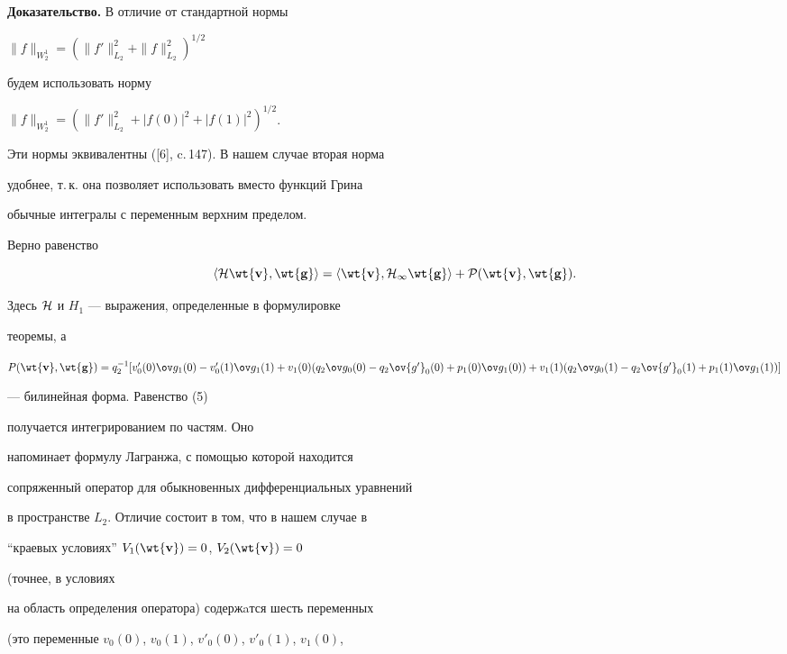  


{\bf Доказательство.} В отличие от стандартной нормы  


$\|f\|_{W^1_2}=(\|f'\|^2_{L_2}+ \|f\|^2_{L_2})^{1/2}$ 


будем использовать норму  


$\|f\|_{W^1_2}=(\|f'\|^2_{L_2}+|f(0)|^2+|f(1)|^2)^{1/2}$. 


Эти нормы эквивалентны ([6], c.\,147). В нашем случае вторая норма  


удобнее, т.\,к. она позволяет использовать вместо функций Грина  


обычные интегралы с переменным верхним пределом.  


 


Верно равенство 


\begin{equation} 


\la\cal H\wt{\bold v},\wt{\bold g}\ra=\la\wt{\bold v}, 


H_1\wt{\bold g}\ra+P(\wt{\bold v},\wt{\bold g}). 


\end{equation} 


Здесь $\cal H$ и $H_1$ --- выражения, определенные в формулировке  


теоремы, а 


$P(\wt{\bold v},\wt{\bold g})=q^{-1}_2[v'_0(0)\ov g_1(0)- 


v'_0(1)\ov g_1(1)+


v_1(0)(q_2\ov g_0(0)-q_2\ov{g'}_0(0)+p_1(0)\ov g_1(0))+ 


v_1(1)(q_2\ov g_0(1)-q_2\ov{g'}_0(1)+p_1(1)\ov g_1(1))]$


--- билинейная форма. Равенство (5) 


получается интегрированием по частям. Оно  


напоминает формулу Лагранжа, с помощью которой находится  


сопряженный оператор для обыкновенных дифференциальных уравнений  


в пространстве $L_2$. Отличие состоит в том, что в нашем случае в  


``краевых условиях'' $V_1(\wt{\bold v})=0$, $V_2(\wt{\bold v})=0$ 


(точнее, в условиях  


на область определения оператора) содержaтся шесть переменных  


(это переменные $v_0(0)$, $v_0(1)$, $v'_0(0)$, $v'_0(1)$, $v_1(0)$, 


